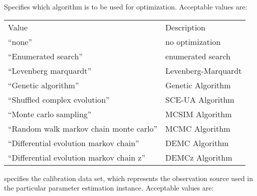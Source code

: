   Specifies which 
 algorithm is to be used for optimization.
 Acceptable values are:

 \begin{tabular}{ll}
 Value                                     & Description         \\
 ``none''                                  & no optimization     \\
 
 ``Enumerated search''                     & enumerated search   \\
 ``Levenberg marquardt''                   & Levenberg-Marquardt \\
 
 ``Genetic algorithm''                     & Genetic Algorithm   \\
 
 ``Shuffled complex evolution''            & SCE-UA Algorithm    \\
 
 ``Monte carlo sampling''                  & MCSIM Algorithm     \\
 
 ``Random walk markov chain monte carlo''  & MCMC Algorithm      \\
 ``Differential evolution markov chain''   & DEMC Algorithm      \\
 
 ``Differential evolution markov chain z'' & DEMCz Algorithm     \\
 \end{tabular}

  specifies
 the calibration data set,
 which represents the observation source used in the particular
 parameter estimation instance.
 Acceptable values are:

